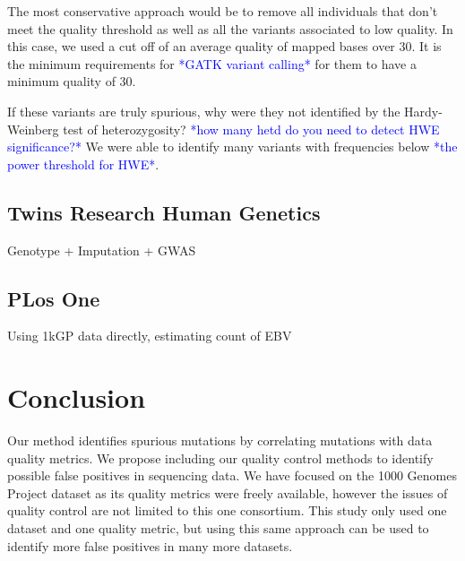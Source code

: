 \documentclass[9pt,lineno]{elife}
\newcommand{\todo}[1]{\textcolor{blue}{*#1*}}
\begin{document}
The most conservative approach would be to remove all individuals that don't meet the quality threshold as well as all the variants associated to low quality.
In this case, we used a cut off of an average quality of mapped bases over 30. It is the minimum requirements for \todo{GATK variant calling} for them to have a minimum quality of 30.

If these variants are truly spurious, why were they not identified by the Hardy-Weinberg test of heterozygosity?
\todo{how many hetd do you need to detect HWE significance?}
We were able to identify many variants with frequencies below \todo{the power threshold for HWE}.


\subsection{Twins Research Human Genetics}
Genotype + Imputation + GWAS

\subsection{PLos One}
Using 1kGP data directly, estimating count of EBV

			\section{Conclusion}
Our method identifies spurious mutations by correlating mutations with data quality metrics. 
We propose including our quality control methods to identify possible false positives in sequencing data. 
We have focused on the 1000 Genomes Project dataset as its quality metrics were freely available, however the issues of quality control are not limited to this one consortium. 
This study only used one dataset and one quality metric, but using this same approach can be used to identify more false positives in many more datasets. 
\end{document}
